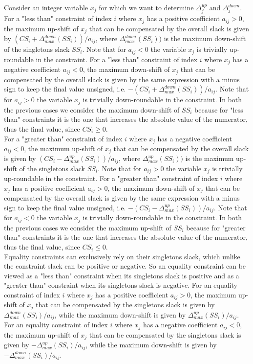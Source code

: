 \documentclass[a4paper,12pt]{book}
\begin{document}
Consider an integer variable $x_j$ for which we want to determine $\Delta_{j}^{up}$ and $\Delta_{j}^{down}$.
For a "less than" constraint of index $i$ where $x_j$ has a positive coefficient $a_{ij} > 0$, the maximum up-shift of $x_j$ that can be compensated by the overall slack is given by $(CS_i + \Delta_{max}^{down}(SS_i)) / a_{ij}$, where $\Delta_{max}^{down}(SS_i))$ is the maximum down-shift of the singletons slack $SS_i$. Note that for $a_{ij} < 0$ the variable $x_j$ is trivially up-roundable in the constraint.
For a "less than" constraint of index $i$ where $x_j$ has a negative coefficient $a_{ij} < 0$, the maximum down-shift of $x_j$ that can be compensated by the overall slack is given by the same expression with a minus sign to keep the final value unsigned, i.e. $-(CS_i + \Delta_{max}^{down}(SS_i)) / a_{ij}$. Note that for $a_{ij} > 0$ the variable $x_j$ is trivially down-roundable in the constraint. In both the previous cases we consider the maximum down-shift of $SS_i$ because for "less than" constraints it is the one that increases the absolute value of the numerator, thus the final value, since $CS_i \geq 0$. \\
For a "greater than" constraint of index $i$ where $x_j$ has a negative coefficient $a_{ij} < 0$, the maximum up-shift of $x_j$ that can be compensated by the overall slack is given by $(CS_i - \Delta_{max}^{up}(SS_i)) / a_{ij}$, where $\Delta_{max}^{up}(SS_i))$ is the maximum up-shift of the singletons slack $SS_i$. Note that for $a_{ij} > 0$ the variable $x_j$ is trivially up-roundable in the constraint.
For a "greater than" constraint  of index $i$ where $x_j$ has a positive coefficient $a_{ij} > 0$, the maximum down-shift of $x_j$ that can be compensated by the overall slack is given by the same expression with a minus sign to keep the final value unsigned, i.e. $-(CS_i - \Delta_{max}^{up}(SS_i)) / a_{ij}$. Note that for $a_{ij} < 0$ the variable $x_j$ is trivially down-roundable in the constraint. In both the previous cases we consider the maximum up-shift of $SS_i$ because for "greater than" constraints it is the one that increases the absolute value of the numerator, thus the final value, since $CS_i \leq 0$. \\
Equality constraints can exclusively rely on their singletons slack, which unlike the constraint slack can be positive or negative. So an equality constraint can be viewed as a "less than" constraint when its singletons slack is positive and as a "greater than" constraint when its singletons slack is negative. For an equality constraint of index $i$ where $x_j$ has a positive coefficient $a_{ij} > 0$, the maximum up-shift of $x_j$ that can be compensated by the singletons slack is given by $\Delta_{max}^{down}(SS_i) / a_{ij}$, while the maximum down-shift is given by $\Delta_{max}^{up}(SS_i) / a_{ij}$. For an equality constraint of index $i$ where $x_j$ has a negative coefficient $a_{ij} < 0$, the maximum up-shift of $x_j$ that can be compensated by the singletons slack is given by $-\Delta_{max}^{up}(SS_i) / a_{ij}$, while the maximum down-shift is given by $-\Delta_{max}^{down}(SS_i) / a_{ij}$. \par 
\end{document}
